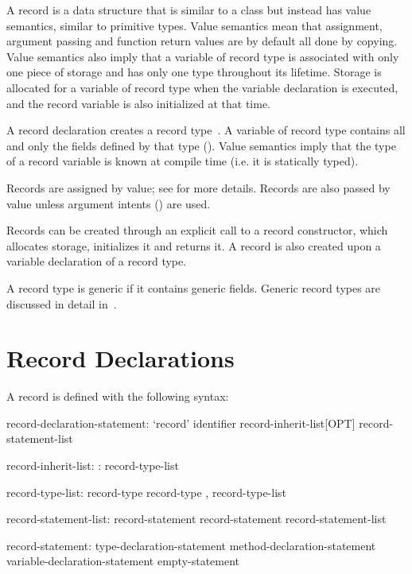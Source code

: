 \label{Records}

A record is a data structure that is similar to a class but instead has value
semantics, similar to primitive types.  Value semantics mean that assignment, argument passing and function
return values are by default all done by copying.  Value semantics also imply that a
variable of record type is associated with only one piece of storage and has
only one type throughout its lifetime.  Storage is allocated for a variable of
record type when the variable declaration is executed, and the record variable
is also initialized at that time.

A record declaration creates a record type~.  A
variable of record type contains all and only the fields defined by that type
().  Value semantics imply that the type of a record variable
is known at compile time (i.e. it is statically typed).  

Records are assigned by value;
see  for more details.  Records are also passed
by value unless argument intents () are used.

Records can be created through an explicit call to a record
constructor, which allocates storage, initializes
it and returns it.  
A record is also created upon a variable declaration of a record type.

A record type is generic if it contains generic fields.  Generic record types
are discussed in detail in~.

\section{Record Declarations}
\label{Record_Declarations}

A record is defined with the following syntax:
\begin{syntax}
record-declaration-statement:
  `record' identifier record-inherit-list[OPT] {
    record-statement-list }

record-inherit-list:
  : record-type-list

record-type-list:
  record-type
  record-type , record-type-list

record-statement-list:
  record-statement
  record-statement record-statement-list

record-statement:
  type-declaration-statement
  method-declaration-statement
  variable-declaration-statement
  empty-statement
\end{syntax}

